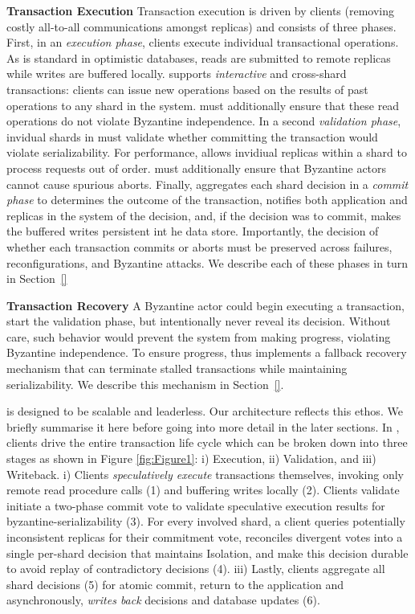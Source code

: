 \par \textbf{Transaction Execution} Transaction execution is driven by clients (removing costly all-to-all communications amongst replicas) and consists of three phases. First, in an \textit{execution phase}, clients execute individual transactional operations. As is standard in optimistic databases, reads are submitted to remote replicas while writes are buffered locally. \sys{} supports \textit{interactive} and cross-shard transactions: clients can issue new operations based on the results of past operations to any shard in the system. \sys{} must additionally ensure that these read operations do not violate Byzantine independence. In a second \textit{validation phase}, invidual shards in \sys{} must validate whether committing the transaction would violate serializability. For performance, \sys{} allows invidiual replicas within a shard to process requests out of order. \sys{} must additionally ensure that Byzantine actors cannot cause spurious aborts. Finally, \sys{} aggregates each shard decision in a \textit{commit phase} to determines the outcome of the transaction, notifies both application and replicas in the system of the decision, and, if the decision was to commit, makes the buffered writes persistent int he data store.  Importantly, the decision of whether each transaction commits or aborts must be preserved across failures, reconfigurations, and Byzantine attacks. We describe each of these phases in turn in Section~\ref{}

\par \textbf{Transaction Recovery} A Byzantine actor could begin executing a transaction, start the validation phase, but intentionally never reveal its decision. Without care,
such behavior would prevent the system from making progress, violating Byzantine independence. To ensure progress, \sys{} thus implements a fallback recovery mechanism that can terminate stalled transactions while maintaining serializability. We describe this mechanism in Section~\ref{}.




\iffalse
\sys is designed to be scalable and leaderless. Our architecture reflects this ethos. We briefly summarise it here before going into more detail in the later sections. 
In \sys, clients drive the entire transaction life cycle which can be broken down into three stages as shown in Figure \ref{fig:Figure1}: i) Execution, ii) Validation, and iii) Writeback. 
i) Clients \textit{speculatively execute} transactions themselves, invoking only remote read procedure calls (1) and buffering writes locally (2). \two Clients validate initiate a two-phase commit vote to validate speculative execution results for byzantine-serializability (3).
For every involved shard, a client queries potentially inconsistent replicas for their commitment vote, reconciles divergent votes into a single per-shard decision that maintains Isolation, and make this decision durable to avoid replay of contradictory decisions (4). 
iii) Lastly, clients aggregate all shard decisions (5) for atomic commit, return to the application and asynchronously, \textit{writes back} decisions and database updates (6).

